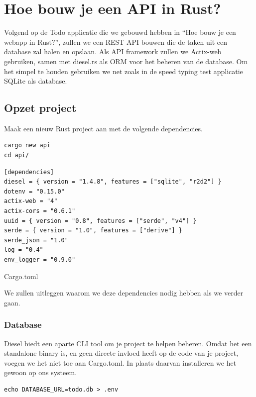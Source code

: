 \section{Hoe bouw je een API in Rust?}

Volgend op de Todo applicatie die we gebouwd hebben in \enquote{Hoe bouw je een webapp in Rust?},
zullen we een REST API bouwen die de taken uit een database zal halen en opslaan. Als API framework
zullen we Actix-web gebruiken, samen met diesel.rs als ORM voor het beheren van de database. Om het
simpel te houden gebruiken we net zoals in de speed typing test applicatie SQLite als database.
\cite{diesel} \cite{actix_docs}


\subsection{Opzet project}

Maak een nieuw Rust project aan met de volgende dependencies.

\begin{verbatim}
cargo new api
cd api/
\end{verbatim}

\begin{listing}[h]
\begin{verbatim}
[dependencies]
diesel = { version = "1.4.8", features = ["sqlite", "r2d2"] }
dotenv = "0.15.0"
actix-web = "4"
actix-cors = "0.6.1"
uuid = { version = "0.8", features = ["serde", "v4"] }
serde = { version = "1.0", features = ["derive"] }
serde_json = "1.0"
log = "0.4"
env_logger = "0.9.0"
\end{verbatim}
\caption{Cargo.toml}
\end{listing}

We zullen uitleggen waarom we deze dependencies nodig hebben als we verder gaan.

\subsubsection{Database}

Diesel biedt een aparte CLI tool om je project te helpen beheren. Omdat het een standalone binary
is, en geen directe invloed heeft op de code van je project, voegen we het niet toe aan Cargo.toml.
In plaats daarvan installeren we het gewoon op ons systeem.

\begin{verbatim}
echo DATABASE_URL=todo.db > .env
\end{verbatim}

